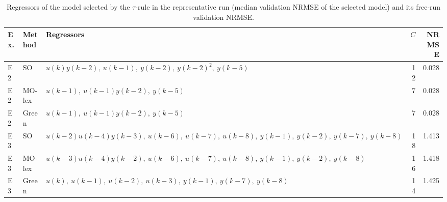 \begin{table}[!htbp]
\centering
\caption{Regressors of the model selected by the $\tau$-rule in the representative run (median validation NRMSE of the selected model) and its free-run validation NRMSE.}
\label{tab:models}
\setlength{\tabcolsep}{3pt}
\footnotesize
\begin{tabular}{llp{8.5cm}rr}
\toprule
Ex. & Method & Regressors & $C$ & NRMSE \\
\midrule
E2 & SO & $u(k) y(k-2),\ u(k-1),\ y(k-2),\ y(k-2)^{2},\ y(k-5)$ & 12 & 0.028 \\
E2 & MO-lex & $u(k-1),\ u(k-1) y(k-2),\ y(k-5)$ & 7 & 0.028 \\
E2 & Green & $u(k-1),\ u(k-1) y(k-2),\ y(k-5)$ & 7 & 0.028 \\
\midrule
E3 & SO & $u(k-2) u(k-4) y(k-3),\ u(k-6),\ u(k-7),\ u(k-8),\ y(k-1),\ y(k-2),\ y(k-7),\ y(k-8)$ & 18 & 1.413 \\
E3 & MO-lex & $u(k-3) u(k-4) y(k-2),\ u(k-6),\ u(k-7),\ u(k-8),\ y(k-1),\ y(k-2),\ y(k-8)$ & 16 & 1.418 \\
E3 & Green & $u(k),\ u(k-1),\ u(k-2),\ u(k-3),\ y(k-1),\ y(k-7),\ y(k-8)$ & 14 & 1.425 \\
\bottomrule
\end{tabular}
\end{table}
